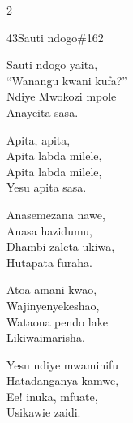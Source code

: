 \begin{multicols}{2}
\begin{hymn}{43}{Sauti ndogo}{\#162}
\begin{stanza}
Sauti ndogo yaita,\\
``Wanangu kwani kufa?''\\
Ndiye Mwokozi mpole\\
Anayeita sasa.
\end{stanza}
\begin{chorus}
Apita, apita,\\
Apita labda milele,\\
Apita labda milele,\\
Yesu apita sasa.
\end{chorus}
\begin{stanza}
Anasemezana nawe,\\
Anasa hazidumu,\\
Dhambi zaleta ukiwa,\\
Hutapata furaha.
\end{stanza}
\begin{stanza}
Atoa amani kwao,\\
Wajinyenyekeshao,\\
Wataona pendo lake\\
Likiwaimarisha.
\end{stanza}
\begin{stanza}
Yesu ndiye mwaminifu\\
Hatadanganya kamwe,\\
Ee! inuka, mfuate,\\
Usikawie zaidi.
\end{stanza}
\end{hymn}


\end{multicols}
